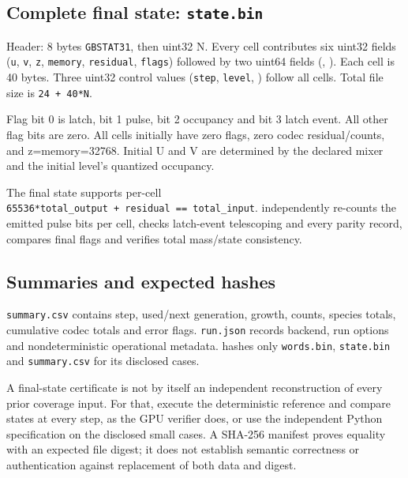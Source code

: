 \documentclass[11pt,a4paper]{article}
\begin{document}
\subsection{\texorpdfstring{Complete final state: \texttt{state.bin}}{Complete final state: state.bin}}\label{complete-final-state-state.bin}

Header: 8 bytes \texttt{GBSTAT31}, then uint32 N. Every cell contributes six uint32 fields (\texttt{u}, \texttt{v}, \texttt{z}, \texttt{memory}, \texttt{residual}, \texttt{flags}) followed by two uint64 fields (, ). Each cell is 40 bytes. Three uint32 control values (\texttt{step}, \texttt{level}, ) follow all cells. Total file size is \texttt{24\ +\ 40*N}.

Flag bit 0 is latch, bit 1 pulse, bit 2 occupancy and bit 3 latch event. All other flag bits are zero. All cells initially have zero flags, zero codec residual/counts, and z=memory=32768. Initial U and V are determined by the declared mixer and the initial level's quantized occupancy.

The final state supports per-cell \texttt{65536*total\_output\ +\ residual\ ==\ total\_input}.  independently re-counts the emitted pulse bits per cell, checks latch-event telescoping and every parity record, compares final flags and verifies total mass/state consistency.

\subsection{Summaries and expected hashes}\label{summaries-and-expected-hashes}

\texttt{summary.csv} contains step, used/next generation, growth, counts, species totals, cumulative codec totals and error flags. \texttt{run.json} records backend, run options and nondeterministic operational metadata.  hashes only \texttt{words.bin}, \texttt{state.bin} and \texttt{summary.csv} for its disclosed cases.

A final-state certificate is not by itself an independent reconstruction of every prior coverage input. For that, execute the deterministic reference and compare states at every step, as the GPU verifier does, or use the independent Python specification on the disclosed small cases. A SHA-256 manifest proves equality with an expected file digest; it does not establish semantic correctness or authentication against replacement of both data and digest.
\end{document}
